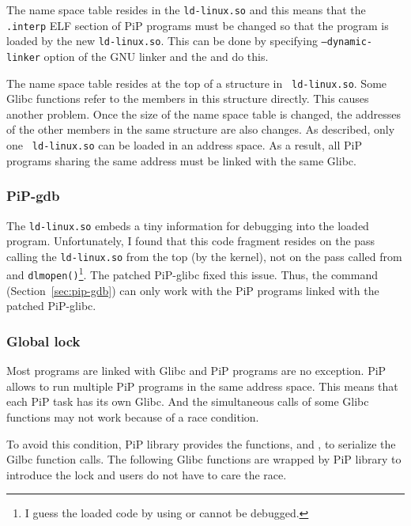 The name space table resides in the {\tt ld-linux.so} and this means
that the {\tt .interp} ELF section of PiP programs must be changed so
that the program is loaded by the new {\tt ld-linux.so}. This can be
done by specifying {\tt --dynamic-linker} option of the GNU linker and
the  and  do this.

The name space table resides at the top of a structure in {\tt
  ld-linux.so}. Some Glibc functions refer to the members in this
structure directly. This causes another problem. Once the size of the
name space table is changed, the addresses of the other members in the
same structure are also changes. As described, only one {\tt
  ld-linux.so} can be loaded in an address space. As a result, all PiP 
programs sharing the same address must be linked with the same Glibc. 

\subsubsection{PiP-gdb}

The {\tt ld-linux.so} embeds a tiny information for debugging into the
loaded program. Unfortunately, I found that this code fragment
resides on the pass calling the {\tt ld-linux.so} from the
top (by the kernel), not on the pass called from 
  and {\tt dlmopen()}\footnote{I guess the loaded code by using
   or  cannot be debugged.}. The
  patched 
  PiP-glibc fixed this issue. Thus, the  command
  (Section~\ref{sec:pip-gdb}) can only work with 
  the PiP programs linked with the patched PiP-glibc.

\subsubsection{Global lock}

Most programs are linked with Glibc and PiP programs are no
exception. PiP allows to run multiple PiP programs in the same address
space. This means that each PiP task has its own Glibc. And the
simultaneous calls of some Glibc functions may not work because of a
race condition. 

To avoid this condition, PiP library provides the functions,
 and , to 
serialize the Gilbc function calls. The following Glibc functions are
wrapped by PiP library to introduce the lock and users do not have to
care the race. 

